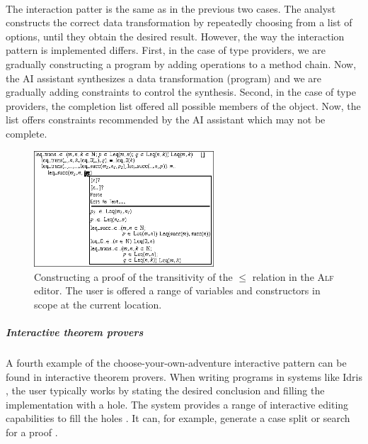 \documentclass[a4paper,UKenglish,cleveref, autoref, thm-restate]{lipics-v2021}
\begin{document}
~

The interaction patter is the same as in the previous two cases. The analyst constructs the
correct data transformation by repeatedly choosing from a list of options, until they obtain
the desired result. However, the way the interaction pattern is implemented differs.
First, in the case of type providers, we are gradually constructing a program by adding operations to
a method chain. Now, the AI assistant synthesizes a data transformation (program) and we are
gradually adding constraints to control the synthesis. Second, in the case of type providers,
the completion list offered all possible members of the object. Now, the list offers
constraints recommended by the AI assistant which may not be complete.

\newpage

\begin{figure}[t]
  \includegraphics[width=0.6\textwidth]{fig/alf.png}
  \caption{Constructing a proof of the transitivity of the $\leq$ relation in the \textsc{Alf}
    editor. The user is offered a range of variables and constructors in scope at the current
    location. \cite{altenkirch-1994-alf}}
  \label{fig:alf}
\end{figure}


\subparagraph{Interactive theorem provers}
A fourth example of the choose-your-own-adventure interactive pattern can be found in interactive
theorem provers. When writing programs in systems like Idris \cite{brady-2021-idris2}, the
user typically works by stating the desired conclusion and filling the implementation with a hole.
The system provides a range of interactive editing capabilities to fill the holes \cite{mcbride-1999-dependently}.
It can, for example, generate a case split or search for a proof \cite{brady-2015-idris}.
\end{document}
